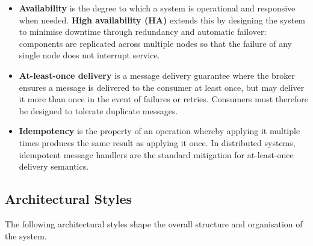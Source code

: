 \begin{itemize}
  \item \textbf{Availability} is the degree to which a system is operational and responsive when needed. \textbf{High availability (HA)} extends this by designing the system to minimise downtime through redundancy and automatic failover: components are replicated across multiple nodes so that the failure of any single node does not interrupt service.

  \item \textbf{At-least-once delivery} is a message delivery guarantee where the broker ensures a message is delivered to the consumer at least once, but may deliver it more than once in the event of failures or retries. Consumers must therefore be designed to tolerate duplicate messages.

  \item \textbf{Idempotency} is the property of an operation whereby applying it multiple times produces the same result as applying it once. In distributed systems, idempotent message handlers are the standard mitigation for at-least-once delivery semantics.
\end{itemize}

\subsection{Architectural Styles}

The following architectural styles shape the overall structure and organisation of the system.

